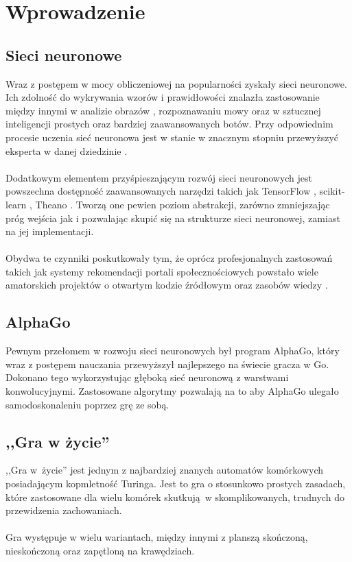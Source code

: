 \chapter{Wprowadzenie}
\label{cha:wprowadzenie}
    \section{Sieci neuronowe}
        Wraz z postępem w mocy obliczeniowej na popularności zyskały 
        sieci neuronowe. Ich zdolność do wykrywania wzorów i 
        prawidłowości znalazła zastosowanie między innymi w analizie
        obrazów \cite{neural-doodle}, rozpoznawaniu mowy oraz w sztucznej
        inteligencji prostych \cite{mari-o} oraz bardziej zaawansowanych
        \cite{alpha-go} botów. Przy odpowiednim procesie uczenia sieć
        neuronowa jest w stanie w znacznym stopniu przewyższyć eksperta 
        w danej dziedzinie \cite{alpha-go}.
        \\ \\
        Dodatkowym elementem przyśpieszającym rozwój sieci neuronowych
        jest powszechna dostępność zaawansowanych narzędzi takich jak 
        TensorFlow \cite{tensor-flow}, scikit-learn \cite{scikit-learn},
        Theano \cite{theano}. Tworzą one pewien poziom abstrakcji, 
        zarówno zmniejszając próg wejścia jak i pozwalając skupić się na 
        strukturze sieci neuronowej, zamiast na jej implementacji.
        \\ \\
        Obydwa te czynniki poskutkowały tym, że oprócz profesjonalnych
        zastosowań takich jak systemy rekomendacji portali
        społecznościowych powstało wiele amatorskich projektów o 
        otwartym kodzie źródłowym \cite{neural-doodle, mari-o, 
        coding-train} oraz zasobów wiedzy \cite{siraj, coding-train}.

    \section{AlphaGo}
        Pewnym przełomem w rozwoju sieci neuronowych był program AlphaGo,
        który wraz z postępem nauczania przewyższył najlepszego na 
        świecie gracza w Go. Dokonano tego wykorzystując głęboką sieć
        neuronową z warstwami konwolucyjnymi. Zastosowane algorytmy
        pozwalają na to aby AlphaGo ulegało samodoskonaleniu poprzez
        grę ze sobą.

    \section{,,Gra w życie''}
        ,,Gra w życie''\cite{stanford-gol} jest jednym z najbardziej 
        znanych automatów komórkowych posiadającym kopmletność Turinga.
        Jest to gra o stosunkowo prostych zasadach, które zastosowane
        dla wielu komórek skutkują w skomplikowanych, trudnych do 
        przewidzenia zachowaniach.
        \\ \\
        Gra występuje w wielu wariantach, między innymi z planszą
        skończoną, nieskończoną oraz zapętloną na krawędziach.

